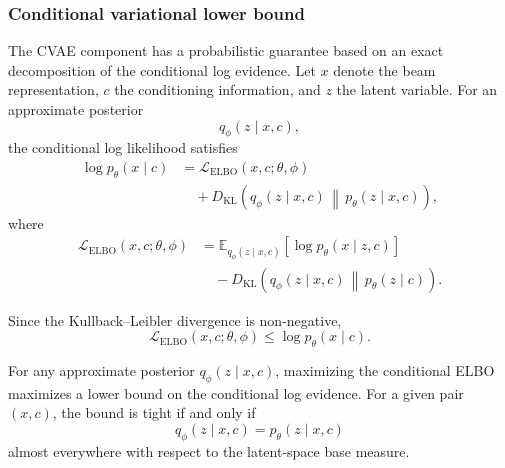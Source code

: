 \documentclass[11pt,a4paper]{article}
\begin{document}
\begin{sloppypar}
\subsubsection{Conditional variational lower bound}

The CVAE component has a probabilistic guarantee based on an exact
decomposition of the conditional log evidence. Let \(x\) denote the beam
representation, \(c\) the conditioning information, and \(z\) the latent
variable. For an approximate posterior
\begin{equation}
    q_{\phi}(z\mid x,c),
\end{equation}
the conditional log likelihood satisfies
\begin{equation}
\begin{aligned}
    \log p_{\theta}(x\mid c)
    &=
    \mathcal{L}_{\mathrm{ELBO}}(x,c;\theta,\phi)
    \\
    &\quad+
    D_{\mathrm{KL}}\!\left(
        q_{\phi}(z\mid x,c)
        \,\middle\|\,
        p_{\theta}(z\mid x,c)
    \right),
\end{aligned}
\label{eq:cvae-elbo-decomposition}
\end{equation}
where
\begin{equation}
\begin{aligned}
    \mathcal{L}_{\mathrm{ELBO}}(x,c;\theta,\phi)
    &=
    \mathbb{E}_{q_{\phi}(z\mid x,c)}
    \left[
        \log p_{\theta}(x\mid z,c)
    \right]
    \\
    &\quad-
    D_{\mathrm{KL}}\!\left(
        q_{\phi}(z\mid x,c)
        \,\middle\|\,
        p_{\theta}(z\mid c)
    \right).
\end{aligned}
\label{eq:cvae-elbo}
\end{equation}

Since the Kullback--Leibler divergence is non-negative,
\begin{equation}
    \mathcal{L}_{\mathrm{ELBO}}(x,c;\theta,\phi)
    \leq
    \log p_{\theta}(x\mid c).
\label{eq:cvae-elbo-lower-bound}
\end{equation}

\begin{proposition}
For any approximate posterior \(q_{\phi}(z\mid x,c)\), maximizing the
conditional ELBO maximizes a lower bound on the conditional log evidence.
For a given pair \((x,c)\), the bound is tight if and only if
\begin{equation}
    q_{\phi}(z\mid x,c)
    =
    p_{\theta}(z\mid x,c)
\end{equation}
almost everywhere with respect to the latent-space base measure.
\end{proposition}


\end{sloppypar}
\end{document}
